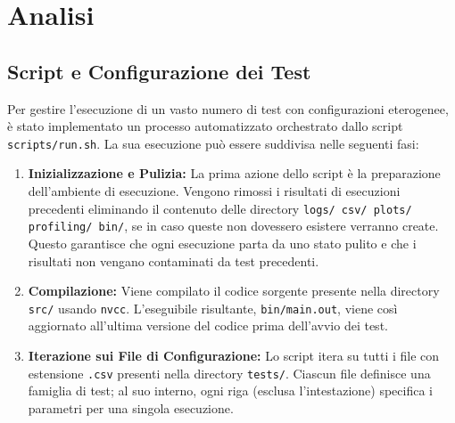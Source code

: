 \section{Analisi}

\subsection{Script e Configurazione dei Test}

Per gestire l'esecuzione di un vasto numero di test con configurazioni eterogenee, è stato implementato un processo automatizzato orchestrato dallo script \texttt{scripts/run.sh}. La sua esecuzione può essere suddivisa nelle seguenti fasi:

\begin{enumerate}
    \item \textbf{Inizializzazione e Pulizia:} La prima azione dello script è la preparazione dell'ambiente di esecuzione. Vengono rimossi i risultati di esecuzioni precedenti eliminando il contenuto delle directory \texttt{logs/ csv/ plots/ profiling/ bin/}, se in caso queste non dovessero esistere verranno create. Questo garantisce che ogni esecuzione parta da uno stato pulito e che i risultati non vengano contaminati da test precedenti.

    \item \textbf{Compilazione:} Viene compilato il codice sorgente presente nella directory \texttt{src/} usando \texttt{nvcc}. L'eseguibile risultante, \texttt{bin/main.out}, viene così aggiornato all'ultima versione del codice prima dell'avvio dei test.

    \item \textbf{Iterazione sui File di Configurazione:} Lo script itera su tutti i file con estensione \texttt{.csv} presenti nella directory \texttt{tests/}. Ciascun file definisce una famiglia di test; al suo interno, ogni riga (esclusa l'intestazione) specifica i parametri per una singola esecuzione.


\end{enumerate}
